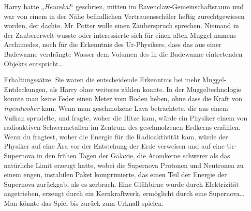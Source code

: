 Harry hatte „\emph{Heureka!}“ geschrien, mitten im Ravenclaw-Gemeinschaftsraum und war von einem in der Nähe befindlichen Vertrauensschüler heftig zurechtgewiesen worden, der dachte, Mr~Potter wolle einen Zauberspruch sprechen. Niemand in der Zaubererwelt wusste oder interessierte sich für einen alten Muggel namens Archimedes, noch für die Erkenntnis des Ur-Physikers, dass das aus einer Badewanne verdrängte Wasser dem Volumen des in die Badewanne eintretenden Objekts entspricht…

Erhaltungssätze. Sie waren die entscheidende Erkenntnis bei mehr Muggel-Entdeckungen, als Harry ohne weiteres zählen konnte. In der Muggeltechnologie konnte man keine Feder einen Meter vom Boden heben, ohne dass die Kraft von \emph{irgendwoher} kam. Wenn man geschmolzene Lava betrachtete, die aus einem Vulkan sprudelte, und fragte, woher die Hitze kam, würde ein Physiker einem von radioaktiven Schwermetallen im Zentrum des geschmolzenen Erdkerns erzählen. Wenn du fragtest, woher die Energie für die Radioaktivität kam, würde der Physiker auf eine Ära vor der Entstehung der Erde verweisen und auf eine Ur-Supernova in den frühen Tagen der Galaxie, die Atomkerne schwerer als das natürliche Limit erzeugt hatte, wobei die Supernova Protonen und Neutronen zu einem engen, instabilen Paket komprimierte, das einen Teil der Energie der Supernova zurückgab, als es zerbrach. Eine Glühbirne wurde durch Elektrizität angetrieben, erzeugt durch ein Kernkraftwerk, ermöglicht durch eine Supernova…Man könnte das Spiel bis zurück zum Urknall spielen.

